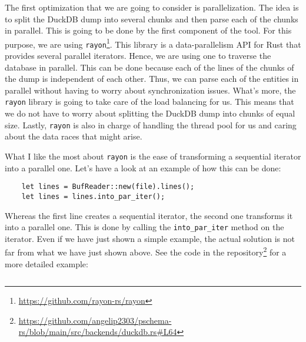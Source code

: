 The first optimization that we are going to consider is parallelization. The idea is to split the DuckDB dump into several chunks and then parse each of the chunks in parallel. This is going to be done by the first component of the tool. For this purpose, we are using \texttt{rayon}\footnote{\url{https://github.com/rayon-rs/rayon}}. This library is a data-parallelism API for Rust that provides several parallel iterators. Hence, we are using one to traverse the database in parallel. This can be done because each of the lines of the chunks of the dump is independent of each other. Thus, we can parse each of the entities in parallel without having to worry about synchronization issues. What's more, the \texttt{rayon} library is going to take care of the load balancing for us. This means that we do not have to worry about splitting the DuckDB dump into chunks of equal size. Lastly, \texttt{rayon} is also in charge of handling the thread pool for us and caring about the data races that might arise.

What I like the most about \texttt{rayon} is the ease of transforming a sequential iterator into a parallel one. Let's have a look at an example of how this can be done:

\begin{verbatim}
    let lines = BufReader::new(file).lines();
    let lines = lines.into_par_iter();
\end{verbatim}

Whereas the first line creates a sequential iterator, the second one transforms it into a parallel one. This is done by calling the \texttt{into\_par\_iter} method on the iterator. Even if we have just shown a simple example, the actual solution is not far from what we have just shown above. See the code in the repository\footnote{\url{https://github.com/angelip2303/pschema-rs/blob/main/src/backends/duckdb.rs\#L64}} for a more detailed example:

\begin{code}
    \inputminted{rust}{code/listings/11-2_duckdb.rs}
\end{code}